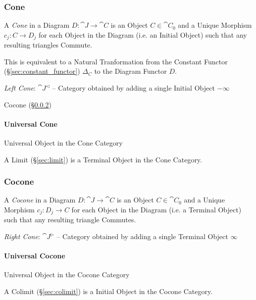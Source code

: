 \subsubsection{Cone}\label{sec:category_cone}

A \emph{Cone} in a Diagram $D : \cat{J} \to \cat{C}$ is an Object $C \in
\cat{C}_0$ and a Unique Morphism $c_j : C \to D_j$ for each Object in the
Diagram (i.e. an Initial Object) such that any resulting triangles Commute.

This is equivalent to a Natural Tranformation from the Constant Functor
(\S\ref{sec:constant_functor}) $\Delta_C$ to the Diagram Functor $D$.

\emph{Left Cone}: $\cat{J}^\vartriangleleft$ -- Category obtained by adding a
single Initial Object $-\infty$

Cocone (\S\ref{sec:cocone})



\paragraph{Universal Cone}\label{sec:universal_cone}\hfill

Universal Object in the Cone Category

A Limit (\S\ref{sec:limit}) is a Terminal Object in the Cone Category.



\subsubsection{Cocone}\label{sec:cocone}

A \emph{Cocone} in a Diagram $D : \cat{J} \rightarrow \cat{C}$ is an Object $C
\in \cat{C}_0$ and a Unique Morphism $c_j : D_j \rightarrow C$ for each Object
in the Diagram (i.e. a Terminal Object) such that any resulting triangle
Commutes.

\emph{Right Cone}: $\cat{J}^\vartriangleright$ -- Category obtained by adding a
single Terminal Object $\infty$



\paragraph{Universal Cocone}\label{sec:universal_cocone}\hfill

Universal Object in the Cocone Category

A Colimit (\S\ref{sec:colimit}) is a Initial Object in the Cocone
Category.



